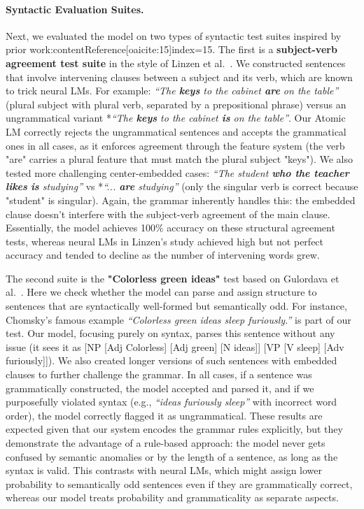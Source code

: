 \documentclass[11pt]{article}
\begin{document}
\paragraph{Syntactic Evaluation Suites.} Next, we evaluated the model on two types of syntactic test suites inspired by prior work:contentReference[oaicite:15]{index=15}. The first is a \textbf{subject-verb agreement test suite} in the style of Linzen et al.~\cite{linzen2016}. We constructed sentences that involve intervening clauses between a subject and its verb, which are known to trick neural LMs. For example: \textit{``The \textbf{keys} to the cabinet \textbf{are} on the table''} (plural subject with plural verb, separated by a prepositional phrase) versus an ungrammatical variant *\textit{``The \textbf{keys} to the cabinet \textbf{is} on the table''}. Our Atomic LM correctly rejects the ungrammatical sentences and accepts the grammatical ones in all cases, as it enforces agreement through the feature system (the verb "are" carries a plural feature that must match the plural subject "keys"). We also tested more challenging center-embedded cases: \textit{``The student \textbf{who the teacher likes} \textbf{is} studying''} vs *\textit{``... \textbf{are} studying''} (only the singular verb is correct because "student" is singular). Again, the grammar inherently handles this: the embedded clause doesn't interfere with the subject-verb agreement of the main clause. Essentially, the model achieves 100\% accuracy on these structural agreement tests, whereas neural LMs in Linzen's study achieved high but not perfect accuracy and tended to decline as the number of intervening words grew.

The second suite is the \textbf{"Colorless green ideas"} test based on Gulordava et al.~\cite{gulordava2018}. Here we check whether the model can parse and assign structure to sentences that are syntactically well-formed but semantically odd. For instance, Chomsky's famous example \textit{``Colorless green ideas sleep furiously.''} is part of our test. Our model, focusing purely on syntax, parses this sentence without any issue (it sees it as [NP [Adj Colorless] [Adj green] [N ideas]] [VP [V sleep] [Adv furiously]]). We also created longer versions of such sentences with embedded clauses to further challenge the grammar. In all cases, if a sentence was grammatically constructed, the model accepted and parsed it, and if we purposefully violated syntax (e.g., \textit{``ideas furiously sleep''} with incorrect word order), the model correctly flagged it as ungrammatical. These results are expected given that our system encodes the grammar rules explicitly, but they demonstrate the advantage of a rule-based approach: the model never gets confused by semantic anomalies or by the length of a sentence, as long as the syntax is valid. This contrasts with neural LMs, which might assign lower probability to semantically odd sentences even if they are grammatically correct, whereas our model treats probability and grammaticality as separate aspects.
\end{document}
